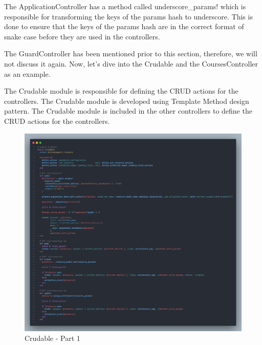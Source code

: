 \begin{justify}
    \vspace{0.25cm}
    \newendline The ApplicationController has a method called underscore\_params! which is responsible for transforming the keys of the params hash to underscore. This is done to ensure that the keys of the params hash are in the correct format of snake case before they are used in the controllers.

    \vspace{0.25cm}
    \newendline The GuardController has been mentioned prior to this section, therefore, we will not discuss it again. Now, let's dive into the Crudable and the CoursesController as an example.

    \vspace{0.25cm}
    \newendline The Crudable module is responsible for defining the CRUD actions for the controllers. The Crudable module is developed using Template Method design pattern. The Crudable module is included in the other controllers to define the CRUD actions for the controllers.

    \begin{figure}[H]
        \centerline{\includegraphics[width=150mm,scale=1]{figures/implementation_and_testing/implementation/backend/curdable-1.png}}
        \caption{Crudable - Part 1}
    \end{figure}



\end{justify}
